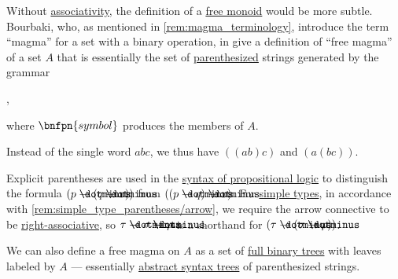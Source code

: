 \begin{example}\label{ex:free_magma}
  Without \hyperref[def:binary_operation/associative]{associativity}, the definition of a \hyperref[def:free_monoid]{free monoid} would be more subtle. Bourbaki, who, as mentioned in \cref{rem:magma_terminology}, introduce the term \enquote{magma} for a set with a binary operation, in \cite[81]{Bourbaki1998Algebra1to3} give a definition of \enquote{free magma} of a set \( A \) that is essentially the set of \hyperref[def:paired_delimiters]{parenthesized} strings generated by the grammar
  \begin{bnf*}
     {\bnftsq{(} \bnfsp {} \bnfsp {} \bnfsp \bnftsq{)} \bnfor {} \bnfor \varepsilon},
  \end{bnf*}
  where \( \bnfpn{symbol} \) produces the members of \( A \).

  Instead of the single word \( abc \), we thus have \( ((ab)c) \) and \( (a(bc)) \).

  Explicit parentheses are used in the \hyperref[def:propositional_syntax]{syntax of propositional logic} to distinguish the formula \( (p \synimplies (q \synimplies r)) \) from \( ((p \synimplies q) \synimplies r) \). For \hyperref[def:simple_type]{simple types}, in accordance with \cref{rem:simple_type_parentheses/arrow}, we require the arrow connective to be \hyperref[rem:binary_operation_syntax_trees/associativity]{right-associative}, so \( \tau \synimplies \sigma \synimplies \rho \) is a shorthand for \( (\tau \synimplies (\sigma \synimplies \rho)) \).

  We can also define a free magma on \( A \) as a set of \hyperref[def:n_ary_tree]{full binary trees} with leaves labeled by \( A \) --- essentially  \hyperref[def:propositional_formula_ast]{abstract syntax trees} of parenthesized strings.
\end{example}

